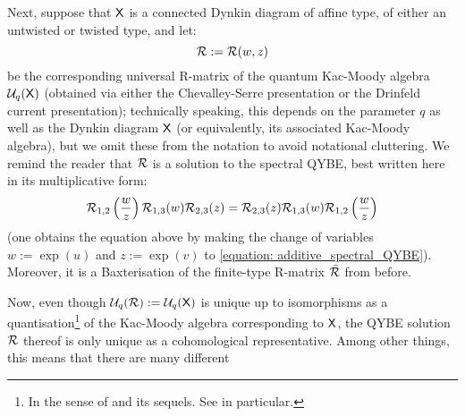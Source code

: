         Next, suppose that $\mathsf{X}$ is a connected Dynkin diagram of affine type, of either an untwisted or twisted type, and let:
            $$\mathcal{R} := \mathcal{R}(w, z)$$
        be the corresponding universal R-matrix of the quantum Kac-Moody algebra $\mathcal{U}_q(\mathsf{X})$ (obtained via either the Chevalley-Serre presentation or the Drinfeld current presentation); technically speaking, this depends on the parameter $q$ as well as the Dynkin diagram $\mathsf{X}$ (or equivalently, its associated Kac-Moody algebra), but we omit these from the notation to avoid notational cluttering. We remind the reader that $\mathcal{R}$ is a solution to the spectral QYBE, best written here in its multiplicative form:
            \begin{equation} \label{equation: constant_QYBE}
                \mathcal{R}_{1, 2}\left(\frac{w}{z}\right) \mathcal{R}_{1, 3}(w) \mathcal{R}_{2, 3}(z) = \mathcal{R}_{2, 3}(z) \mathcal{R}_{1, 3}(w) \mathcal{R}_{1, 2}\left(\frac{w}{z}\right)
            \end{equation}
        (one obtains the equation above by making the change of variables $w := \exp(u)$ and $z := \exp(v)$ to \eqref{equation: additive_spectral_QYBE}). Moreover, it is a Baxterisation of the finite-type R-matrix $\bar{\mathcal{R}}$ from before.

        Now, even though $\mathcal{U}_q(\mathcal{R}) := \mathcal{U}_q(\mathsf{X})$ is unique up to isomorphisms as a quantisation\footnote{In the sense of \cite{etingof_kazhdan_quantisation_1} and its sequels. See \cite{etingof_kazhdan_quantisation_6} in particular.} of the Kac-Moody algebra corresponding to $\mathsf{X}$, the QYBE solution $\mathcal{R}$ thereof is only unique as a cohomological representative. Among other things, this means that there are many different 

